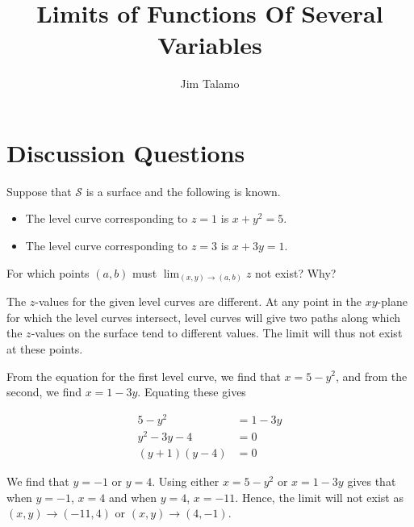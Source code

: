 \documentclass[noauthor, handout]{ximera}
\author{Jim Talamo}
\title[Collaborate:]{Limits of Functions Of Several Variables}
\newcommand{\Lim}[2]{\lim_{#1 \to #2}}
\begin{document}
\begin{abstract}
\end{abstract}
\maketitle

\section{Discussion Questions}



\begin{problem}
Suppose that $\mathcal{S}$ is a surface and the following is known.
\begin{itemize}
\item The level curve corresponding to $z=1$ is $x+y^2=5$.
\item The level curve corresponding to $z=3$ is $x +3y=1$.
\end{itemize}

For which points $(a,b)$ must $\Lim{(x,y)}{(a,b)} z$ not exist?  Why?
 
\begin{freeResponse}
The $z$-values for the given level curves are different. At any point in the $xy$-plane for which the level curves intersect, level curves will give two paths along which the $z$-values on the surface tend to different values.  The limit will thus not exist at these points.

From the equation for the first level curve, we find that $x=5-y^2$, and from the second, we find $x=1-3y$.  Equating these gives

\begin{align*}
5-y^2 &= 1-3y \\
y^2-3y-4 &=0 \\
(y+1)(y-4) &= 0
\end{align*}

We find that $y=-1$ or $y=4$.  Using either $x=5-y^2$ or $x=1-3y$ gives that when $y=-1$, $x=4$ and when $y=4$, $x=-11$.  Hence, the limit will not exist as $(x,y) \to (-11,4)$ or $(x,y) \to (4,-1)$.

\end{freeResponse}
\end{problem}

\end{document}
